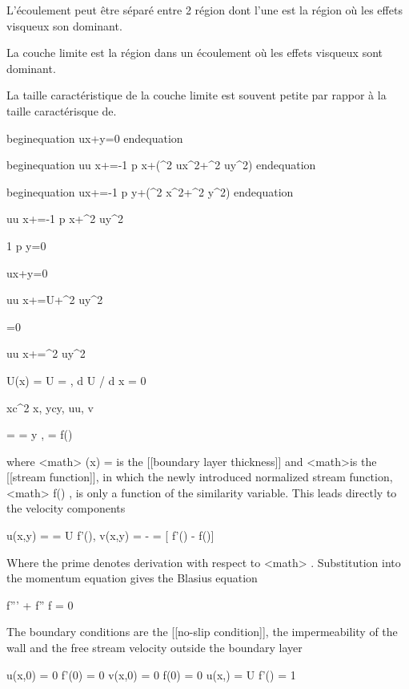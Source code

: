 
L'écoulement peut être séparé entre 2 région dont l'une est la région où les effets visqueux son dominant.

La couche limite est la région dans un écoulement où les effets visqueux 
sont dominant.

La taille caractéristique de la couche limite est souvent petite 
par rappor à la taille caractérisque de.

begin{equation}
 {\partial u\over\partial x}+{\partial \upsilon\over\partial y}=0 
end{equation}

begin{equation}
 u{\partial u \over \partial x}+=-{1\over \rho} {\partial p \over \partial x}+{\nu}\left({\partial^2 u\over \partial x^2}+{\partial^2 u\over \partial y^2}\right) 
end{equation}

begin{equation}
 u{\partial \upsilon \over \partial x}+=-{1\over \rho} {\partial p \over \partial y}+{\nu}\left({\partial^2 \upsilon\over \partial x^2}+{\partial^2 \upsilon\over \partial y^2}\right) 
end{equation}


 u{\partial u \over \partial x}+=-{1\over \rho} {\partial p \over \partial x}+{\nu}{\partial^2 u\over \partial y^2} 

 {1\over \rho} {\partial p \over \partial y}=0 


 {\partial u\over\partial x}+{\partial \upsilon\over\partial y}=0 

 u{\partial u \over \partial x}+=U+{\nu}{\partial^2 u\over \partial y^2} 


 =0 


 u{\partial u \over \partial x}+={\nu}{\partial^2 u\over \partial y^2} 
 

U(x) = U = ,  d U / d x = 0

x\rightarrow c^2 x, \quad y\rightarrow cy, \quad u\rightarrow u, \quad v\rightarrow {}


 \eta =  = y , \quad  \psi =  f(\eta) 

where <math> \delta(x) =   is the [[boundary layer thickness]] and <math>\psi is the [[stream function]], in which the newly introduced normalized stream function, <math> f(\eta) , is only a function of the similarity variable. This leads directly to the velocity components

 u(x,y) =    = U f'(\eta), \quad v(x,y) = -  =  [ \eta f'(\eta) - f(\eta)]  

Where the prime denotes derivation with respect to <math> \eta .
Substitution into the momentum equation gives the Blasius equation

 f''' + f'' f = 0 

The boundary conditions are the [[no-slip condition]], the impermeability of the wall and the free stream velocity outside the boundary layer

 u(x,0) = 0 \rightarrow f'(0) = 0 
 v(x,0) = 0 \rightarrow f(0) = 0  
 u(x,\infty) = U \rightarrow f'(\infty) = 1 
